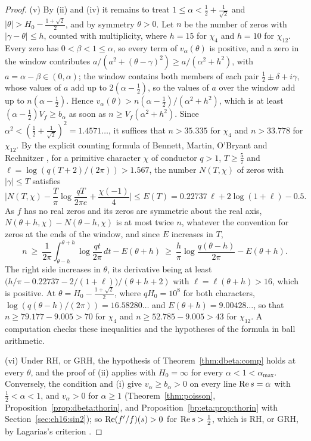 \begin{proof}
(v) By (ii) and (iv) it remains to treat $1\le\alpha<\frac12+\frac1{\sqrt2}$ and $|\theta|>H_0-\frac{1+\sqrt2}2$, and by symmetry $\theta>0$. Let $n$ be the number of zeros with $|\gamma-\theta|\le h$, counted with multiplicity, where $h=15$ for $\chi_4$ and $h=10$ for $\chi_{12}$. Every zero has $0<\beta<1\le\alpha$, so every term of $v_\alpha(\theta)$ is positive, and a zero in the window contributes $a/(a^2+(\theta-\gamma)^2)\ge a/(\alpha^2+h^2)$, with $a=\alpha-\beta\in(0,\alpha)$; the window contains both members of each pair $\frac12\pm\delta+i\gamma$, whose values of $a$ add up to $2(\alpha-\frac12)$, so the values of $a$ over the window add up to $n(\alpha-\frac12)$. Hence $v_\alpha(\theta)>n(\alpha-\frac12)/(\alpha^2+h^2)$, which is at least $(\alpha-\frac12)V_f\ge b_\alpha$ as soon as $n\ge V_f(\alpha^2+h^2)$. Since $\alpha^2<(\frac12+\frac1{\sqrt2})^2=1.4571\ldots$, it suffices that $n>35.335$ for $\chi_4$ and $n>33.778$ for $\chi_{12}$. By the explicit counting formula of Bennett, Martin, O'Bryant and Rechnitzer \cite[Theorem 1.1]{BMOR21}, for a primitive character $\chi$ of conductor $q>1$, $T\ge\frac57$ and $\ell=\log(q(T+2)/(2\pi))>1.567$, the number $N(T,\chi)$ of zeros with $|\gamma|\le T$ satisfies
\[
\Big|N(T,\chi)-\frac T\pi\log\frac{qT}{2\pi e}+\frac{\chi(-1)}4\Big|\le E(T)=0.22737\,\ell+2\log(1+\ell)-0.5 .
\]
As $f$ has no real zeros and its zeros are symmetric about the real axis, $N(\theta+h,\chi)-N(\theta-h,\chi)$ is at most twice $n$, whatever the convention for zeros at the ends of the window, and since $E$ increases in $T$,
\[
n\ \ge\ \frac1{2\pi}\int_{\theta-h}^{\theta+h}\log\frac{qt}{2\pi}\,dt-E(\theta+h)\ \ge\ \frac h\pi\log\frac{q(\theta-h)}{2\pi}-E(\theta+h).
\]
The right side increases in $\theta$, its derivative being at least $\big(h/\pi-0.22737-2/(1+\ell)\big)/(\theta+h+2)$ with $\ell=\ell(\theta+h)>16$, which is positive. At $\theta=H_0-\frac{1+\sqrt2}2$, where $qH_0=10^8$ for both characters, $\log(q(\theta-h)/(2\pi))=16.58280\ldots$ and $E(\theta+h)=9.00428\ldots$, so that $n\ge79.177-9.005>70$ for $\chi_4$ and $n\ge52.785-9.005>43$ for $\chi_{12}$. A computation checks these inequalities and the hypotheses of the formula in ball arithmetic.

(vi) Under RH, or GRH, the hypothesis of Theorem~\ref{thm:dbeta:comp} holds at every $\theta$, and the proof of (ii) applies with $H_0=\infty$ for every $\alpha<1<\alpha_{\max}$. Conversely, the condition and (i) give $v_\alpha\ge b_\alpha>0$ on every line $\operatorname{Re} s=\alpha$ with $\frac12<\alpha<1$, and $v_\alpha>0$ for $\alpha\ge1$ (Theorem~\ref{thm:poisson}, Proposition~\ref{prop:dbeta:thorin}, and Proposition~\ref{bp:eta:prop:thorin} with Section~\ref{sec:ch16:sin2}); so $\operatorname{Re}(f'/f)(s)>0$ for $\operatorname{Re} s>\frac12$, which is RH, or GRH, by Lagarias's criterion \cite{Lagarias}.
\end{proof}

